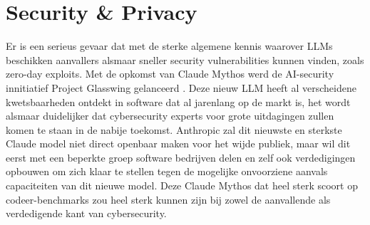 \section{Security \& Privacy}
\label{sec:securityandprivacy}

Er is een serieus gevaar dat met de sterke algemene kennis waarover LLMs beschikken aanvallers alsmaar sneller security vulnerabilities kunnen vinden, zoals zero-day exploits. Met de opkomst van Claude Mythos werd de AI-security innitiatief Project Glasswing gelanceerd \autocite{Anthropic}. Deze nieuw LLM heeft al verscheidene kwetsbaarheden ontdekt in software dat al jarenlang op de markt is, het wordt alsmaar duidelijker dat cybersecurity experts voor grote uitdagingen zullen komen te staan in de nabije toekomst. Anthropic zal dit nieuwste en sterkste Claude model niet direct openbaar maken voor het wijde publiek, maar wil dit eerst met een beperkte groep software bedrijven delen en zelf ook verdedigingen opbouwen om zich klaar te stellen tegen de mogelijke onvoorziene aanvals capaciteiten van dit nieuwe model. Deze Claude Mythos dat heel sterk scoort op codeer-benchmarks zou heel sterk kunnen zijn bij zowel de aanvallende als verdedigende kant van cybersecurity. \\

